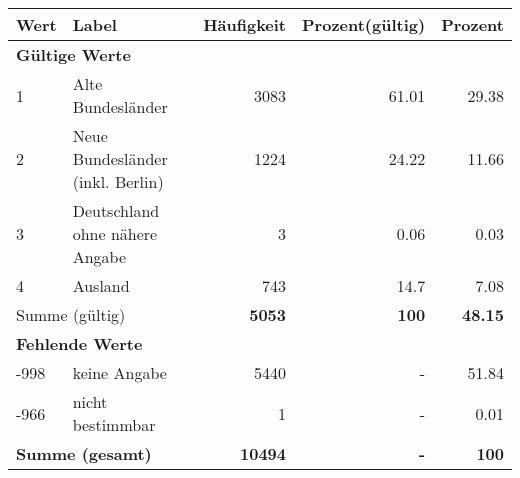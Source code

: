      \begin{longtable}{lXrrr}
     \toprule
     \textbf{Wert} & \textbf{Label} & \textbf{Häufigkeit} & \textbf{Prozent(gültig)} & \textbf{Prozent} \\
     \endhead
     \midrule
     \multicolumn{5}{l}{\textbf{Gültige Werte}}\\

     1 &
     \multicolumn{1}{X}{ Alte Bundesländer   } &


       \num{3083} &
       \num[round-mode=places,round-precision=2]{61,01} &
         \num[round-mode=places,round-precision=2]{29,38} \\

     2 &
     \multicolumn{1}{X}{ Neue Bundesländer (inkl. Berlin)   } &


       \num{1224} &
       \num[round-mode=places,round-precision=2]{24,22} &
         \num[round-mode=places,round-precision=2]{11,66} \\

     3 &
     \multicolumn{1}{X}{ Deutschland ohne nähere Angabe   } &


       \num{3} &
       \num[round-mode=places,round-precision=2]{0,06} &
         \num[round-mode=places,round-precision=2]{0,03} \\

     4 &
     \multicolumn{1}{X}{ Ausland   } &


       \num{743} &
       \num[round-mode=places,round-precision=2]{14,7} &
         \num[round-mode=places,round-precision=2]{7,08} \\
     \midrule
     \multicolumn{2}{l}{Summe (gültig)} &
       \textbf{\num{5053}} &
     \textbf{100} &
       \textbf{\num[round-mode=places,round-precision=2]{48,15}} \\
     \multicolumn{5}{l}{\textbf{Fehlende Werte}}\\
       -998 &
       keine Angabe &
         \num{5440} &
        - &
         \num[round-mode=places,round-precision=2]{51,84} \\
       -966 &
       nicht bestimmbar &
         \num{1} &
        - &
         \num[round-mode=places,round-precision=2]{0,01} \\
     \midrule
     \multicolumn{2}{l}{\textbf{Summe (gesamt)}} &
          \textbf{\num{10494}} &
        \textbf{-} &
        \textbf{100} \\
     \bottomrule
     \end{longtable}
     
